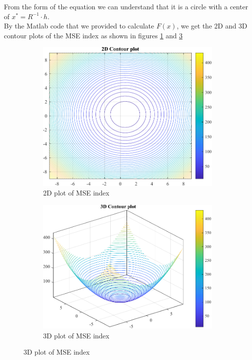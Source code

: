 From the form of the equation we can understand that it is a circle with a center of $x^* = R^{-1} \cdot h.$\\
By the Matlab code that we provided to calculate $F(x)$, we get the 2D and 3D contour plots of the MSE index as shown in figures \ref{fig:prob_9_2d} and \ref{fig:prob_9_3d}\\
\begin{figure}[H]
	\centering
	\begin{subfigure}{0.47\textwidth}
		\centering
		\includegraphics[width=\textwidth]{../Problem 9/contour_2d.pdf}
		\caption{2D plot of MSE index}
		\label{fig:prob_9_2d}
	\end{subfigure}
	\hspace{2mm}
	\begin{subfigure}{0.47\textwidth}
		\centering
		\includegraphics[width=\textwidth]{../Problem 9/contour_3d.pdf}
		\caption{3D plot of MSE index}
		\label{fig:prob_9_3d}
	\end{subfigure}	
\end{figure}

